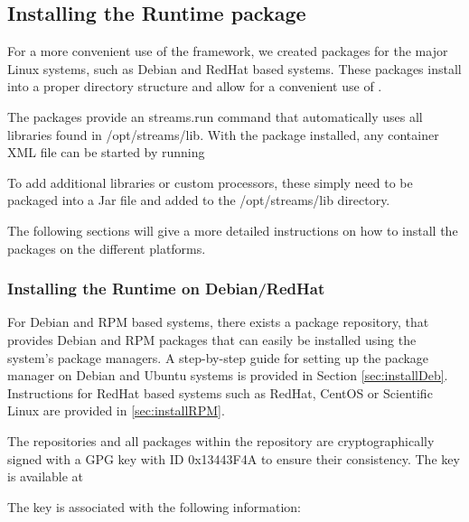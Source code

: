 \subsection{Installing the \streams Runtime package}
For a more convenient use of the \streams framework, we created packages
for the major Linux systems, such as Debian and RedHat based systems. These
packages install into a proper directory structure and allow for a convenient
use of \streams.

The packages provide an {\ttfamily streams.run} command that automatically
uses all libraries found in {\ttfamily /opt/streams/lib}. With the \streams
package installed, any container XML file can be started by running

\hspace{4ex}

To add additional libraries or custom processors, these simply need to be
packaged into a Jar file and added to the {\ttfamily /opt/streams/lib}
directory.

\medskip

The following sections will give a more detailed instructions on how
to install the \streams packages on the different platforms.


\subsubsection{Installing the \streams Runtime on Debian/RedHat}
For Debian and RPM based systems, there exists a package repository,
that provides Debian and RPM packages that can easily be installed
using the system's package managers. A step-by-step guide for setting
up the package manager on Debian and Ubuntu systems is provided in
Section \ref{sec:installDeb}. Instructions for RedHat based systems
such as RedHat, CentOS or Scientific Linux are provided in
\ref{sec:installRPM}.


The repositories and all packages within the repository are
cryptographically signed with a GPG key with ID {\ttfamily 0x13443F4A}
to ensure their consistency. The key is available at


The key is associated with the following information:


